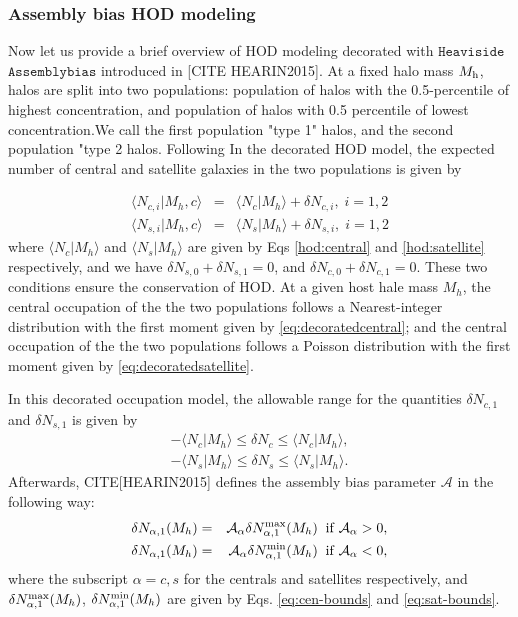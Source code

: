 \documentclass[14pt, preprint]{emulateapj}
\begin{document}
\subsubsection{Assembly bias HOD modeling}\label{subsubsec:decorated}
Now let us provide a brief overview of HOD modeling decorated with $\mathtt{Heaviside}$ $\mathtt{Assemblybias}$ introduced in [CITE HEARIN2015]. At a fixed halo mass $M_{\rm h}$, halos are split into two populations: population of halos with the 0.5-percentile of highest concentration, and population of halos with 0.5 percentile of lowest concentration.We call the first population "type 1" halos, and the second population "type 2 halos. Following In the decorated HOD model, the expected number of central and satellite galaxies in the two populations is given by

\begin{eqnarray}
\langle N_{c,i} | M_{h},c\rangle &=& \langle N_{c} | M_{h}\rangle + \delta N _{c,i}, \; i=1,2 \label{eq:decoratedcentral} \\
\langle N_{s,i} | M_{h},c\rangle &=& \langle N_{s} | M_{h}\rangle + \delta N _{s,i}, \; i=1,2 \label{eq:decoratedsatellite}
\end{eqnarray}
where $\langle N_{c} | M_{h}\rangle$ and $\langle N_{s} | M_{h}\rangle$ are given by Eqs \ref{hod:central} and \ref{hod:satellite} respectively, and we have $\delta N_{s,0} + \delta N_{s,1} = 0$, and $\delta N_{c,0} + \delta N_{c,1} = 0$. These two conditions ensure the conservation of HOD. At a given host hale mass $M_{h}$, the central occupation of the the two populations follows a Nearest-integer distribution with the first moment given by \ref{eq:decoratedcentral}; and the central occupation of the the two populations follows a Poisson distribution with the first moment given by \ref{eq:decoratedsatellite}. 

In this decorated occupation model, the allowable range for the quantities $\delta N_{c,1}$ and $\delta N_{s,1}$ is given by 
\begin{eqnarray}
-\langle N_{c} | M_{h}\rangle \leq \delta N_{c} \leq \langle N_{c} | M_{h}\rangle
 , \label{eq:cen-bounds} \\
-\langle N_{s} | M_{h}\rangle \leq \delta N_{s} \leq \langle N_{s} | M_{h}\rangle. \label{eq:sat-bounds}
\end{eqnarray}
Afterwards, CITE[HEARIN2015] defines the assembly bias parameter $\mathcal{A}$ in the following way:
\begin{eqnarray}
\delta N_{\alpha , 1}(M_{h}) &=& \mathcal{A_\alpha} \delta N_{\alpha , 1}^{\rm max}(M_{h}) \; \; \rm{if} \; \mathcal{A_\alpha} > 0,  \\
\delta N_{\alpha , 1}(M_{h}) &=& \mathcal{A_\alpha} \delta N_{\alpha , 1}^{\rm min}(M_{h}) \; \; \rm{if} \; \mathcal{A_\alpha} < 0,
\end{eqnarray}
where the subscript $\alpha = c , s$ for the centrals and satellites respectively, and $\delta N_{\alpha , 1}^{\rm max}(M_{h})$, $\delta N_{\alpha , 1}^{\rm min}(M_{h})$ are given by Eqs. \ref{eq:cen-bounds} and \ref{eq:sat-bounds}. 
\end{document}
